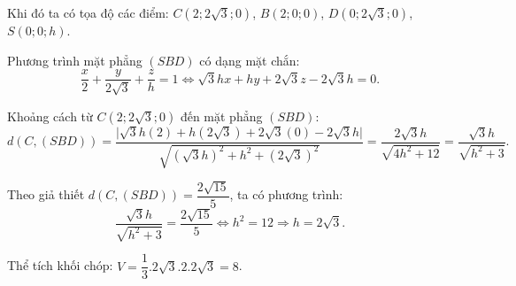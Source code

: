 \begin{ex}
{\begin{center}
		\end{center}
		
		Khi đó ta có tọa độ các điểm: $C(2; 2\sqrt{3}; 0)$, $B(2; 0; 0)$, $D(0; 2\sqrt{3}; 0)$, $S(0; 0; h)$.
		
		Phương trình mặt phẳng $(SBD)$ có dạng mặt chắn:
		$$\dfrac{x}{2} + \dfrac{y}{2\sqrt{3}} + \dfrac{z}{h} = 1 \Leftrightarrow \sqrt{3}hx + hy + 2\sqrt{3}z - 2\sqrt{3}h = 0.$$
		
		Khoảng cách từ $C(2; 2\sqrt{3}; 0)$ đến mặt phẳng $(SBD)$:
		$$d(C, (SBD)) = \dfrac{\big|\sqrt{3}h(2) + h(2\sqrt{3}) + 2\sqrt{3}(0) - 2\sqrt{3}h\big|}{\sqrt{(\sqrt{3}h)^2 + h^2 + (2\sqrt{3})^2}} = \dfrac{2\sqrt{3}h}{\sqrt{4h^2 + 12}} = \dfrac{\sqrt{3}h}{\sqrt{h^2 + 3}}.$$
		
		Theo giả thiết $d(C, (SBD)) = \dfrac{2\sqrt{15}}{5}$, ta có phương trình:
		$$\dfrac{\sqrt{3}h}{\sqrt{h^2 + 3}} = \dfrac{2\sqrt{15}}{5}  \Leftrightarrow h^2 = 12 \Rightarrow h = 2\sqrt{3}.$$
		
		Thể tích khối chóp: $V = \dfrac{1}{3} . 2\sqrt{3} .2. 2\sqrt{3} = 8$.
		
	}
\end{ex}

